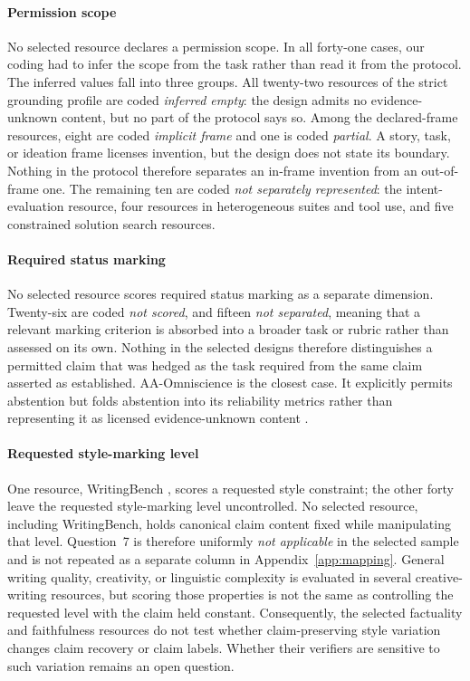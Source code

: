 \documentclass{clv2025}
\begin{document}
\paragraph{Permission scope}
No selected resource declares a permission scope.
In all forty-one cases, our coding had to infer the scope from the task rather
than read it from the protocol. The inferred values fall into three groups.
All twenty-two resources of the strict grounding profile are coded
\emph{inferred empty}: the design admits no evidence-unknown content, but no
part of the protocol says so.
Among the declared-frame resources, eight are coded \emph{implicit frame} and
one is coded \emph{partial}. A story, task, or ideation frame licenses
invention, but the design does not state its boundary. Nothing in the protocol
therefore separates an in-frame invention from an out-of-frame one.
The remaining ten are coded \emph{not separately represented}: the
intent-evaluation resource, four resources in heterogeneous suites and tool use,
and five constrained solution search resources.

\paragraph{Required status marking}
No selected resource scores required status marking as a separate dimension.
Twenty-six are coded \emph{not scored}, and fifteen \emph{not separated},
meaning that a relevant marking criterion is absorbed into a broader task or
rubric rather than assessed on its own.
Nothing in the selected designs therefore distinguishes a permitted claim that
was hedged as the task required from the same claim asserted as established.
AA-Omniscience is the closest case. It explicitly permits abstention but folds
abstention into its reliability metrics rather than representing it as licensed
evidence-unknown content
\citep{jackson_aaomniscience_2025}.

\paragraph{Requested style-marking level}
One resource, WritingBench \citep{wu_writingbench_2025}, scores a requested
style constraint; the other forty leave the requested style-marking level
uncontrolled.
No selected resource, including WritingBench, holds canonical claim content
fixed while manipulating that level.
Question~7 is therefore uniformly \emph{not applicable} in the selected sample
and is not repeated as a separate column in Appendix~\ref{app:mapping}.
General writing quality, creativity, or linguistic complexity is evaluated in
several creative-writing resources, but scoring those properties is not the
same as controlling the requested level with the claim held constant.
Consequently, the selected factuality and faithfulness resources do not test
whether claim-preserving style variation changes claim recovery or claim
labels. Whether their verifiers are sensitive to such variation remains an open
question.
\end{document}
